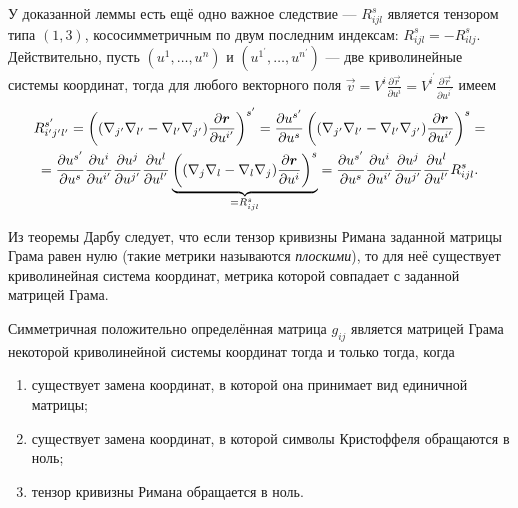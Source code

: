 У доказанной леммы есть ещё одно важное следствие --- $R^s_{ijl}$ является тензором типа $(1, 3)$, кососимметричным по двум последним индексам: $R^s_{ijl} = -R^s_{ilj}$. Действительно, пусть $(u^1, \ldots, u^n)$ и $(u^{1^\prime}, \ldots, u^{n^\prime})$ --- две криволинейные системы координат\footnotemark{}, тогда для любого векторного поля $\vec{v} = V^i\frac{\partial\vec{r}}{\partial u^i} = V^{i^\prime}\frac{\partial\vec{r}}{\partial u^{i^\prime}}$ имеем
\begin{multline*}
	R^{s^\prime}_{i^\prime j^\prime l^\prime} = \left((\nabla_{j^\prime}\nabla_{l^\prime} - \nabla_{l^\prime}\nabla_{j^\prime})\frac{\partial\boldsymbol{r}}{\partial u^{i^{\prime}}}\right)^{s^\prime} = \frac{\partial u^{s^\prime}}{\partial u^s}\left((\nabla_{j^\prime}\nabla_{l^\prime} - \nabla_{l^\prime}\nabla_{j^\prime})\frac{\partial\boldsymbol{r}}{\partial u^{i^\prime}}\right)^s =\\ = \frac{\partial u^{s^\prime}}{\partial u^s}\frac{\partial u^i}{\partial u^{i^\prime}}\frac{\partial u^j}{\partial u^{j^\prime}}\frac{\partial u^l}{\partial u^{l^\prime}}\underbrace{\left((\nabla_j\nabla_l - \nabla_l\nabla_j)\frac{\partial\boldsymbol{r}}{\partial u^i}\right)^s}_{=R^s_{ijl}} = \frac{\partial u^{s^\prime}}{\partial u^s}\frac{\partial u^i}{\partial u^{i^\prime}}\frac{\partial u^j}{\partial u^{j^\prime}}\frac{\partial u^l}{\partial u^{l^\prime}}R^s_{ijl}.
\end{multline*}


Из теоремы Дарбу следует, что если тензор кривизны Римана заданной матрицы Грама равен нулю (такие метрики называются \textit{плоскими}), то для неё существует криволинейная система координат, метрика которой совпадает с заданной матрицей Грама.

\begin{theorem}
	Симметричная положительно определённая матрица $g_{ij}$ является матрицей Грама некоторой криволинейной системы координат тогда и только тогда, когда
	\begin{enumerate}[nolistsep, label=(\arabic*)]
		\item существует замена координат, в которой она принимает вид единичной матрицы;
		\item существует замена координат, в которой символы Кристоффеля обращаются в ноль;
		\item тензор кривизны Римана обращается в ноль.
	\end{enumerate}
\end{theorem}

